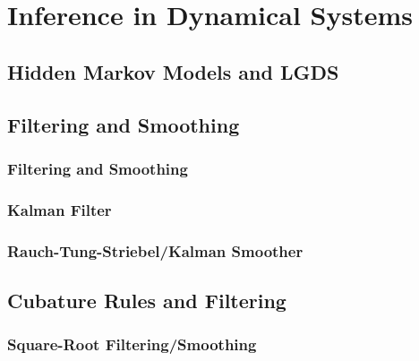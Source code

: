 \chapter{Inference in Dynamical Systems}
	\label{c:inferenceInDynamicalSystems}


	\section{Hidden Markov Models and LGDS}


	\section{Filtering and Smoothing}
		\subsection{Filtering and Smoothing}

		\subsection{Kalman Filter}

		\subsection{Rauch-Tung-Striebel/Kalman Smoother}

	\section{Cubature Rules and Filtering}

		\subsection{Square-Root Filtering/Smoothing}
